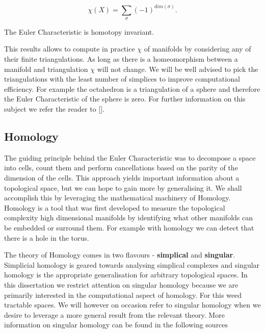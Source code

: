 $$ \chi(X) = \sum_{\sigma}{(-1)^{dim(\sigma)}} .$$

\begin{lem}   The Euler Characteristic is homotopy invariant. \end{lem}

This results allows to compute in practice $\chi$ of manifolds by considering any of their finite triangulations. As long as there is a homeomorphism between a manifold and triangulation $\chi$ will not change. We will be well advised to pick the triangulations with the least number of simplices to improve computational efficiency. For example the octahedron is a triangulation of a sphere and therefore the Euler Characteristic of the sphere is zero. For further information on this subject we refer the reader to [].

\subsection{Homology}

The guiding principle behind the Euler Characteristic was to decompose a space into cells, count them and perform cancellations based on the parity of the dimension of the cells. This approach yields important information about a topological space, but we can hope to gain more by generalising it. We shall accomplish this by leveraging the mathematical machinery of Homology. Homology is a tool that was first developed to measure the topological complexity high dimensional manifolds \cite{persistence-original} by identifying what other manifolds can be embedded or surround them. For example with homology we can detect that there is a hole in the torus.

The theory of Homology comes in two flavours - \textbf{simplical} and \textbf{singular}. Simplicial homology is geared towards analysing simplical complexes and singular homology is the appropriate generalisation for arbitrary topological spaces. In this dissertation we restrict attention on singular homology because we are primarily interested in the computational aspect of homology. For this weed tractable spaces. We will however on occasion refer to singular homology when we desire to leverage a more general result from the relevant theory. More information on singular homology can be found in the following sources \cite{algebraic-topology, elementary-applied-topology}


